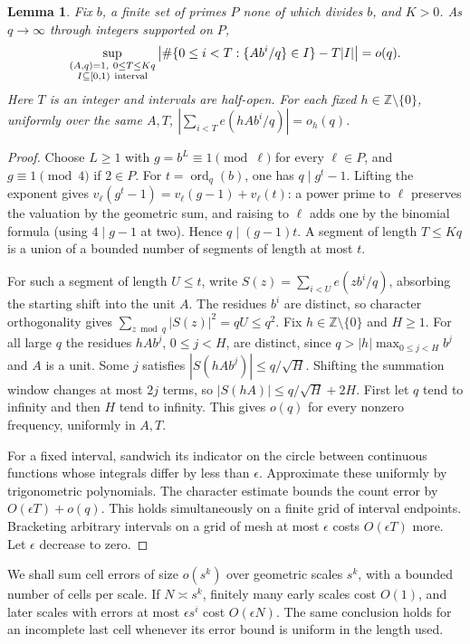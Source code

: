 \documentclass[11pt]{article}
\newtheorem{lemma}[theorem]{Lemma}
\newcommand{\Z}{\mathbb Z}
\newcommand{\ord}{\operatorname{ord}}
\newcommand{\fr}[1]{\{#1\}}
\begin{document}
\begin{lemma}\label{lem:orbits}
Fix \(b\), a finite set of primes \(P\) none of which divides \(b\), and \(K>0\). As \(q\to\infty\) through integers supported on \(P\),
\[
 \sup_{\substack{(A,q)=1,\ 0\le T\le Kq\\ I\subseteq[0,1)\ {\rm interval}}}
 \left|\#\{0\le i<T:\fr{A b^i/q}\in I\}-T|I|\right|=o(q).
\]
Here \(T\) is an integer and intervals are half-open. For each fixed
\(h\in\Z\setminus\{0\}\), uniformly over the same \(A,T\),
\(\left|\sum_{i<T}e(hA b^i/q)\right|=o_h(q)\).
\end{lemma}
\begin{proof}
Choose \(L\ge1\) with \(g=b^L\equiv1\pmod\ell\) for every \(\ell\in P\), and \(g\equiv1\pmod4\) if \(2\in P\). For \(t=\ord_q(b)\), one has \(q\mid g^t-1\). Lifting the exponent gives
\(v_\ell(g^t-1)=v_\ell(g-1)+v_\ell(t)\): a power prime to \(\ell\) preserves the valuation by the geometric sum, and raising to \(\ell\) adds one by the binomial formula (using \(4\mid g-1\) at two). Hence \(q\mid (g-1)t\). A segment of length \(T\le Kq\) is a union of a bounded number of segments of length at most \(t\).

For such a segment of length \(U\le t\), write \(S(z)=\sum_{i<U}e(zb^i/q)\), absorbing the starting shift into the unit \(A\). The residues \(b^i\) are distinct, so character orthogonality gives \(\sum_{z\bmod q}|S(z)|^2=qU\le q^2\). Fix \(h\in\Z\setminus\{0\}\) and \(H\ge1\). For all large \(q\) the residues \(hAb^j\), \(0\le j<H\), are distinct, since \(q>|h|\max_{0\le j<H}b^j\) and \(A\) is a unit. Some \(j\) satisfies \(|S(hAb^j)|\le q/\sqrt H\). Shifting the summation window changes at most \(2j\) terms, so \(|S(hA)|\le q/\sqrt H+2H\). First let \(q\) tend to infinity and then \(H\) tend to infinity. This gives \(o(q)\) for every nonzero frequency, uniformly in \(A,T\).

For a fixed interval, sandwich its indicator on the circle between continuous functions whose integrals differ by less than \(\epsilon\). Approximate these uniformly by trigonometric polynomials. The character estimate bounds the count error by \(O(\epsilon T)+o(q)\). This holds simultaneously on a finite grid of interval endpoints. Bracketing arbitrary intervals on a grid of mesh at most \(\epsilon\) costs \(O(\epsilon T)\) more. Let \(\epsilon\) decrease to zero.
\end{proof}

We shall sum cell errors of size \(o(s^k)\) over geometric scales \(s^k\), with a bounded number of cells per scale. If \(N\asymp s^k\), finitely many early scales cost \(O(1)\), and later scales with errors at most \(\epsilon s^i\) cost \(O(\epsilon N)\). The same conclusion holds for an incomplete last cell whenever its error bound is uniform in the length used.
\end{document}
